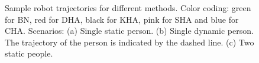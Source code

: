 \begin{figure}
{}%
%
%

\caption{Sample robot trajectories for different methods. Color coding: green for BN, red for DHA, black for KHA, pink for SHA and blue for CHA. Scenarios: (a) Single static person. (b) Single dynamic person. The trajectory of the person is indicated by the dashed line. (c) Two static people.
}
\label{fig:trajs}
\end{figure}

